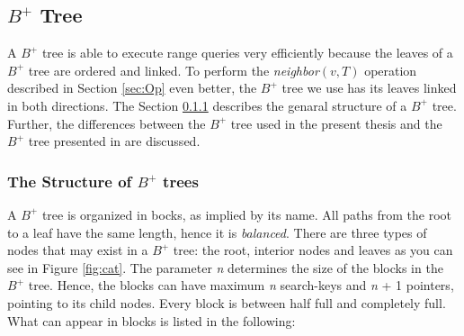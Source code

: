 \documentclass[abstracton,12pt]{scrreprt}
\begin{document}
\subsection{$B^+$ Tree}
A $B^+$ tree is able to execute range queries very efficiently because the leaves of a $B^+$ tree are ordered and linked. To perform the \emph{neighbor}$(v,T)$ operation described in Section \ref{sec:Op} even better, the $B^+$ tree we use has its leaves linked in both directions. The Section \ref{structureBtree} describes the genaral structure of a $B^+$ tree. Further, the differences between the $B^+$ tree used in the present thesis and the $B^+$ tree presented in \cite{BTreeBook} are discussed. 

\subsubsection{The Structure of $B^+$ trees}
\label{structureBtree}
A $B^+$ tree is organized in bocks, as implied by its name. All paths from the root to a leaf have the same length, hence it is \emph{balanced}. There are three types of nodes that may exist in a $B^+$ tree: the root, interior nodes and leaves as you can see in Figure \ref{fig:cat}. The parameter \emph{n} determines the size of the blocks in the $B^+$ tree. Hence, the blocks can have maximum \emph{n} search-keys and \emph{n} + 1 pointers, pointing to its child nodes. Every block is between half full and completely full. What can appear in blocks is listed in the following: \\
\end{document}
